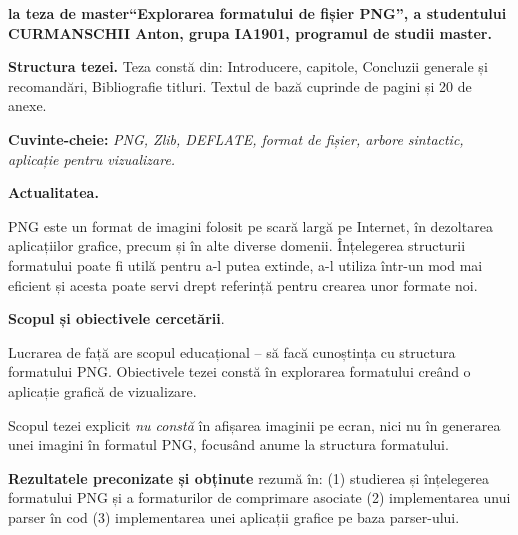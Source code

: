 \documentclass[a4paper,12pt]{report}
\newcommand{\authorName}{CURMANSCHII Anton}
\newcommand{\thesisTitle}{Explorarea formatului de fișier PNG}
\newcommand{\uniGroupName}{IA1901}
\newcommand{\thesisType}{master}
\newcommand{\programulDeStudii}{master}
\newcommand{\anexeCount}{20}
\begin{document}


\clearpage
\tableofcontents

\clearpage
{}
\begin{acronym}[RAII]
\end{acronym}


\clearpage
{}

\textbf{la teza de \thesisType ``\thesisTitle'', a studentului \authorName{}, grupa \uniGroupName{}, programul de studii \programulDeStudii.}

\textbf{Structura tezei.}
Teza constă din: Introducere,  capitole, Concluzii generale și recomandări, Bibliografie \bibliographyEntryCount{} titluri.
Textul de bază cuprinde \usefulPageCount{} de pagini și \anexeCount{} de anexe.

\textbf{Cuvinte-cheie:}
\textit{\ac{PNG}, \ac{Zlib}, \ac{DEFLATE}, format de fișier, arbore sintactic, aplicație pentru vizualizare.}

\textbf{Actualitatea.}

\ac{PNG} este un format de imagini folosit pe scară largă pe Internet,
în dezoltarea aplicațiilor grafice, precum și în alte diverse domenii.
Înțelegerea structurii formatului poate fi utilă pentru a-l putea extinde, 
a-l utiliza într-un mod mai eficient și acesta poate servi drept referință pentru 
crearea unor formate noi.

\textbf{Scopul și obiectivele cercetării}.

Lucrarea de față are scopul educațional -- să facă cunoștința cu structura formatului \ac{PNG}.
Obiectivele tezei constă în explorarea formatului creând o aplicație grafică de vizualizare.

Scopul tezei explicit \textit{nu constă} în afișarea imaginii pe ecran,
nici nu în generarea unei imagini în formatul PNG,
focusând anume la structura formatului.

\textbf{Rezultatele preconizate și obținute} rezumă în: 
(1) studierea și înțelegerea formatului \ac{PNG} și a formaturilor de comprimare asociate 
(2) implementarea unui parser în cod
(3) implementarea unei aplicații grafice pe baza parser-ului.
\end{document}
